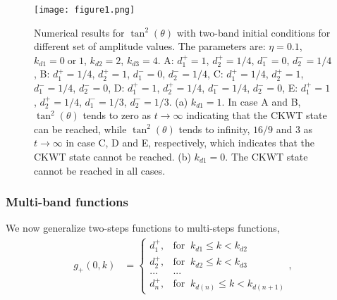 \documentclass[english,aps,superscriptaddress,preprint]{revtex4-1}
\begin{document}
\begin{figure}
\caption{\label{fig:WQ-H2-two-band}Numerical results for $\tan^{2}(\theta)$
with two-band initial conditions for different set of amplitude values.
The parameters are: $\eta=0.1$, $k_{d1}=0\;\mathrm{or}\;1$, $k_{d2}=2$,
$k_{d3}=4$. A: $d_{1}^{+}=1$, $d_{2}^{+}=1/4$, $d_{1}^{-}=0$,
$d_{2}^{-}=1/4$, B: $d_{1}^{+}=1/4$, $d_{2}^{+}=1$, $d_{1}^{-}=0$,
$d_{2}^{-}=1/4$, C: $d_{1}^{+}=1/4$, $d_{2}^{+}=1$, $d_{1}^{-}=1/4$,
$d_{2}^{-}=0$, D: $d_{1}^{+}=1$, $d_{2}^{+}=1/4$, $d_{1}^{-}=1/4$,
$d_{2}^{-}=0$, E: $d_{1}^{+}=1$, $d_{2}^{+}=1/4$, $d_{1}^{-}=1/3$,
$d_{2}^{-}=1/3$. (a) $k_{d1}=1$. In case A and B, $\tan^{2}(\theta)$
tends to zero as $t\rightarrow\infty$ indicating that the CKWT state
can be reached, while $\tan^{2}(\theta)$ tends to infinity, $16/9$
and $3$ as $t\rightarrow\infty$ in case C, D and E, respectively,
which indicates that the CKWT state cannot be reached. (b) $k_{d1}=0$.
The CKWT state cannot be reached in all cases.}

\centering{}\texttt{[image: figure1.png]}
\end{figure}


\subsubsection{Multi-band functions}

We now generalize two-steps functions to multi-steps functions, 
\begin{align}
g_{+}\left(0,k\right) & =\begin{cases}
d_{1}^{+}, & \mathrm{for}\;\;k_{d1}\leq k<k_{d2}\\
d_{2}^{+}, & \mathrm{for}\;\;k_{d2}\leq k<k_{d3}\\
... & ...\\
d_{n}^{+}, & \mathrm{for}\;\;k_{d(n)}\leq k<k_{d(n+1)}
\end{cases},
\end{align}
\end{document}
